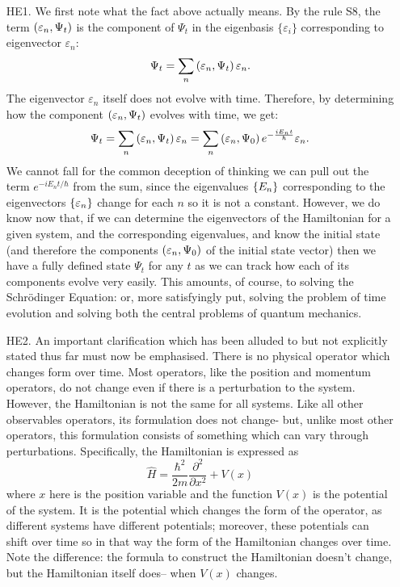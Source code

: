 \begin{enumerate}
    \item[HE1.] We first note what the fact above actually means. By the rule S8, the term $\left(\varepsilon_{n},\Psi_{t}\right)$ is the component of $\Psi_{t}$ in the eigenbasis $\{\varepsilon_{i}\}$ corresponding to eigenvector  $\varepsilon_{n}$:
    $$
    \Psi_{t}=\sum_{n}\left(\varepsilon_{n},\Psi_{t}\right)\varepsilon_{n}.
    $$
    The eigenvector $\varepsilon_{n}$ itself does not evolve with time. Therefore, by determining how the component $\left(\varepsilon_{n},\Psi_{t}\right)$ evolves with time, we get:
    $$
    \Psi_{t}=\sum_{n}\left(\varepsilon_{n},\Psi_{t}\right)\varepsilon_{n}=\sum_{n}\left(\varepsilon_{n},\Psi_{0}\right)e^{-\frac{iE_{n}t}{\hbar}}\varepsilon_{n}.
    $$
    We cannot fall for the common deception of thinking we can pull out the term $e^{-{iE_{n}t}/{\hbar}}$ from the sum, since the eigenvalues $\{E_{n}\}$ corresponding to the eigenvectors $\{\varepsilon_{n}\}$ change for each $n$ so it is not a constant. However, we do know now that, if we can determine the eigenvectors of the Hamiltonian for a given system, and the corresponding eigenvalues, and know the initial state (and therefore the components $\left(\varepsilon_{n},\Psi_{0}\right)$ of the initial state vector) then we have a fully defined state $\Psi_{t}$ for any $t$ as we can track how each of its components evolve very easily. This amounts, of course, to solving the Schr\"{o}dinger Equation: or, more satisfyingly put, solving the problem of time evolution and solving both the central problems of quantum mechanics.
    \item[HE2.] An important clarification which has been alluded to but not explicitly stated thus far must now be emphasised. There is no physical operator which changes form over time. Most operators, like the position and momentum operators, do not change even if there is a perturbation to the system. However, the Hamiltonian is not the same for all systems. Like all other observables operators, its formulation does not change- but, unlike most other operators, this formulation consists of something which can vary through perturbations. Specifically, the Hamiltonian is expressed as 
    $$
    \hat{H}=\frac{\hbar^{2}}{2m}\frac{\partial^2}{\partial x^2}+V(x)
    $$
    where $x$ here is the position variable and the function $V(x)$ is the potential of the system. It is the potential which changes the form of the operator, as different systems have different potentials; moreover, these potentials can shift over time so in that way the form of the Hamiltonian changes over time. Note the difference: the formula to construct the Hamiltonian doesn't change, but the Hamiltonian itself does-- when $V(x)$ changes. 

\end{enumerate}
